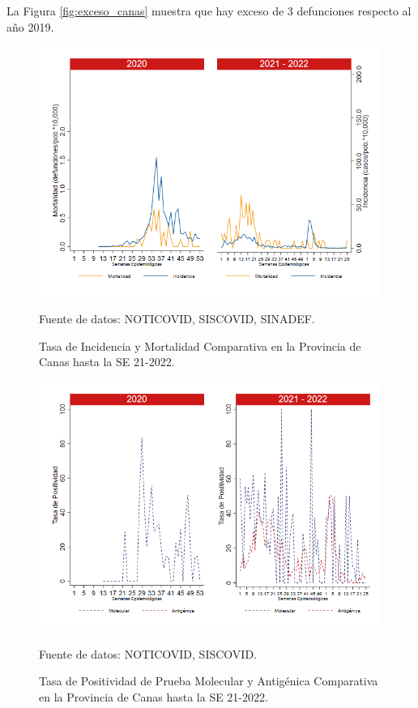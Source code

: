 \documentclass[12pt,a4paper,openany]{book}
\begin{document}
	La Figura \ref{fig:exceso_canas} muestra que hay exceso de 3 defunciones respecto al año 2019.
	
	\begin{figure}[h]
		\caption{Tasa de Incidencia y Mortalidad Comparativa en la Provincia de Canas hasta la SE 21-2022.}\label{fig:inc_mort_canas}
		\begin{center}
			\includegraphics[width=0.85\linewidth]{../figuras/incidencia_mortalidad_20_21_3.png}
		\end{center}
		{\footnotesize {Fuente de datos: NOTICOVID, SISCOVID, SINADEF.}}
	\end{figure}
	
	\begin{figure}[h]
		\caption{Tasa de Positividad de Prueba Molecular y Antigénica Comparativa en la Provincia de Canas hasta la SE 21-2022.}\label{fig:positividad_canas}
		\begin{center}
			\includegraphics[width=0.7\linewidth]{../figuras/positividad_20_21_3.png}
		\end{center}
		{\footnotesize {Fuente de datos: NOTICOVID, SISCOVID.}}
	\end{figure}
	
\end{document}
